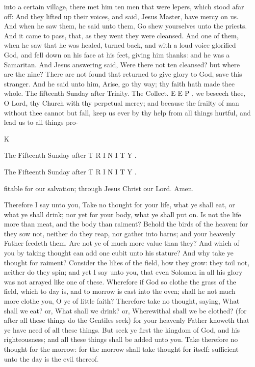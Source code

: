 into a certain village, there met him ten men that were lepers, which stood afar off: And they lifted up their voices, and said, Jesus Master, have mercy on us. And when he saw them, he said unto them, Go shew yourselves unto the priests. And it came to pass, that, as they went they were cleansed. And one of them, when he saw that he was healed, turned back, and with a loud voice glorified God, and fell down on his face at his feet, giving him thanks: and he was a Samaritan. And Jesus answering said, Were there not ten cleansed? but where are the nine? There are not found that returned to give glory to God, save this stranger. And he said unto him, Arise, go thy way; thy faith hath made thee whole. The fifteenth Sunday after Trinity. The Collect. E E P , we beseech thee, O Lord, thy Church with thy perpetual mercy; and because the frailty of man without thee cannot but fall, keep us ever by thy help from all things hurtful, and lead us to all things pro-

K

The Fifteenth Sunday after T R I N I T Y .

The Fifteenth Sunday after T R I N I T Y .

fitable for our salvation; through Jesus Christ our Lord. Amen.

Therefore I say unto you, Take no thought for your life, what ye shall eat, or what ye shall drink; nor yet for your body, what ye shall put on. Is not the life more than meat, and the body than raiment? Behold the birds of the heaven: for they sow not, neither do they reap, nor gather into barns; and your heavenly Father feedeth them. Are not ye of much more value than they? And which of you by taking thought can add one cubit unto his stature? And why take ye thought for raiment? Consider the lilies of the field, how they grow: they toil not, neither do they spin; and yet I say unto you, that even Solomon in all his glory was not arrayed like one of these. Wherefore if God so clothe the grass of the field, which to day is, and to morrow is cast into the oven; shall he not much more clothe you, O ye of little faith? Therefore take no thought, saying, What shall we eat? or, What shall we drink? or, Wherewithal shall we be clothed? (for after all these things do the Gentiles seek) for your heavenly Father knoweth that ye have need of all these things. But seek ye first the kingdom of God, and his righteousness; and all these things shall be added unto you. Take therefore no thought for the morrow: for the morrow shall take thought for itself: sufficient unto the day is the evil thereof.

